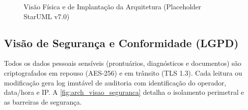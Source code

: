 \begin{figure}[htbp]
    \centering
    \caption{Visão Física e de Implantação da Arquitetura (Placeholder StarUML v7.0)}
    \label{fig:arch_visao_implantacao}
\end{figure}

\subsection{Visão de Segurança e Conformidade (LGPD)}
Todos os dados pessoais sensíveis (prontuários, diagnósticos e documentos) são criptografados em repouso (AES-256) e em trânsito (TLS 1.3). Cada leitura ou modificação gera log imutável de auditoria com identificação do operador, data/hora e IP. A \autoref{fig:arch_visao_seguranca} detalha o isolamento perimetral e as barreiras de segurança.

